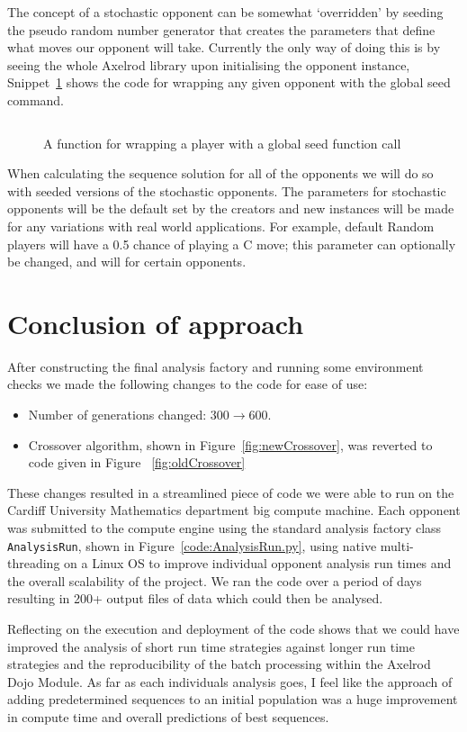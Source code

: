 The concept of a stochastic opponent can be somewhat `overridden' by seeding the pseudo random number generator that creates the parameters that define what moves our opponent will take.
Currently the only way of doing this is by seeing the whole Axelrod library upon initialising the opponent instance, Snippet~\ref{code:wrappingFunction} shows the code for wrapping any given opponent with the global seed command.

\begin{figure}
    \inputminted{python}{code_snippets/classWrappingFunction.py}
    \caption{A function for wrapping a player with a global seed function call}\label{code:wrappingFunction}
\end{figure}

When calculating the sequence solution for all of the opponents we will do so with seeded versions of the stochastic opponents.
The parameters for stochastic opponents will be the default set by the creators and new instances will be made for any variations with real world applications.
For example, default Random players will have a 0.5 chance of playing a C move;
this parameter can optionally be changed, and will for certain opponents.

\section{Conclusion of approach}\label{sec:conclusionOfApproach}
After constructing the final analysis factory and running some environment checks we made the following changes to the code for ease of use:
\begin{itemize}
    \item Number of generations changed: $300\rightarrow600$.
    \item Crossover algorithm, shown in Figure~\ref{fig:newCrossover}, was reverted to code given in Figure ~\ref{fig:oldCrossover}
\end{itemize}

These changes resulted in a streamlined piece of code we were able to run on the Cardiff University Mathematics department big compute machine.
Each opponent was submitted to the compute engine using the standard analysis factory class \texttt{AnalysisRun}, shown in Figure~\ref{code:AnalysisRun.py}, using native multi-threading on a Linux OS to improve individual opponent analysis run times and the overall scalability of the project.
We ran the code over a period of days resulting in 200+ output files of data which could then be analysed.

Reflecting on the execution and deployment of the code shows that we could have improved the analysis of short run time strategies against longer run time strategies and the reproducibility of the batch processing within the Axelrod Dojo Module.
As far as each individuals analysis goes, I feel like the approach of adding predetermined sequences to an initial population was a huge improvement in compute time and overall predictions of best sequences. 
